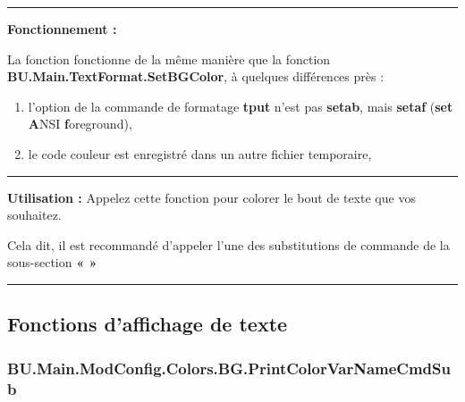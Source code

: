 \documentclass[a4paper,10pt]{article}
\begin{document}

\par\noindent\rule{\textwidth}{0.4pt}

\begin{justify}
    \textbf{Fonctionnement :}

    La fonction fonctionne de la même manière que la fonction \textbf{\color{func}BU.Main.TextFormat.SetBGColor}, à quelques différences près :
    \begin{enumerate}
        \item l'option de la commande de formatage \textbf{\color{cmds}tput} n'est pas \textbf{setab}, mais \textbf{setaf} (\textbf{set} \textbf{A}NSI \textbf{f}oreground),
        \item le code couleur est enregistré dans un autre fichier temporaire,
    \end{enumerate}
\end{justify}




\par\noindent\rule{\textwidth}{0.4pt}

\begin{justify}
    \textbf{Utilisation :} Appelez cette fonction pour colorer le bout de texte que vos souhaitez.
\end{justify}

\begin{justify}
    Cela dit, il est recommandé d'appeler l'une des substitutions de commande de la sous-section \textbf{\color{sec2}«  »}
\end{justify}







\color{sec2}\par\noindent\rule{\textwidth}{0.4pt}\color{text}

\color{sec2}
\subsection{Fonctions d'affichage de texte}\color{text}

\color{sec3}
\subsubsection{BU.Main.ModConfig.Colors.BG.PrintColorVarNameCmdSub}\color{text}
\end{document}
